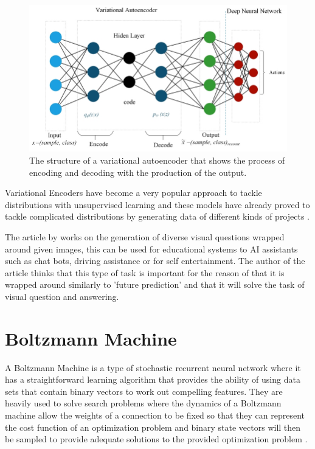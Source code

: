 \begin{figure}
  \centering
  \includegraphics[width=1\linewidth]{graphics/generational_models/vae.png}
  \caption{The structure of a variational autoencoder that shows the process of encoding and decoding with the production of the output. }
  \label{fig:GAN}
\end{figure}

Variational Encoders have become a very popular approach to tackle distributions with unsupervised learning and these models have already proved to tackle complicated distributions by generating data of different kinds of projects \citet{doersch:2016}.

The article by \citet{jain:2017} works on the generation of diverse visual questions wrapped around given images, this can be used for educational systems to AI assistants such as chat bots, driving assistance or for self entertainment. The author of the article thinks that this type of task is important for the reason of that it is wrapped around similarly to 'future prediction' and that it will solve the task of visual question and answering.   

\pagebreak
\section{Boltzmann Machine}

A Boltzmann Machine is a type of stochastic recurrent neural network where it has a straightforward learning algorithm that provides the ability of using data sets that contain binary vectors to work out compelling features. They are heavily used to solve search problems where the dynamics of a Boltzmann machine allow the weights of a connection to be fixed so that they can represent the cost function of an optimization problem and binary state vectors will then be sampled to provide adequate solutions to the provided optimization problem \citet{hinton:2007}. 

